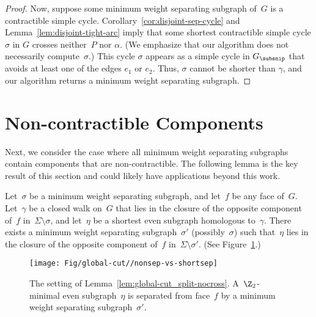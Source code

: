 \begin{proof}
Now, suppose some minimum weight separating subgraph of~$G$ is a contractible simple cycle. Corollary~\ref{cor:disjoint-sep-cycle} and Lemma~\ref{lem:disjoint-tight-arc} imply that some shortest contractible simple cycle $\sigma$ in $G$ crosses neither~$P$ nor $\alpha$.  (We emphasize that our algorithm does not necessarily compute~$\sigma$.)  This cycle $\sigma$ appears as a simple cycle in $\Gsnip$ that avoids at least one of the edges $e_1$ or $e_2$.  Thus, $\sigma$ cannot be shorter than $\gamma$, and our algorithm returns a minimum weight separating subgraph.
\end{proof}


\section{Non-contractible Components}
\label{sec:global-cut_non-contractible}
Next, we consider the case where all minimum weight separating subgraphs contain components that are non-contractible. The following lemma is the key result of this section and could likely have applications beyond this work.
\begin{lemma}
\label{lem:global-cut_split-nocross}
Let~$\sigma$ be a minimum weight separating subgraph, and let~$f$ be any face of~$G$.
Let~$\gamma$ be a closed walk on~$G$ that lies in the closure of the opposite component of~$f$ in~$\Sigma \setminus \sigma$, and let~$\eta$
be a shortest even subgraph homologous to~$\gamma$.
There exists a minimum weight separating subgraph~$\sigma'$ (possibly~$\sigma$) such
that~$\eta$ lies in the closure of the opposite component of~$f$ in~$\Sigma \setminus \sigma'$. (See Figure~\ref{fig:global-cut_nonsep-vs-shortsep}.)
\end{lemma}
\begin{figure}[t]
\centering
\texttt{[image: Fig/global-cut//nonsep-vs-shortsep]}
\caption{The setting of Lemma~\ref{lem:global-cut_split-nocross}. A~$\Z_2$-minimal even subgraph~$\eta$ is separated from face~$f$ by a minimum weight separating subgraph~$\sigma'$.}
\label{fig:global-cut_nonsep-vs-shortsep}
\end{figure}

